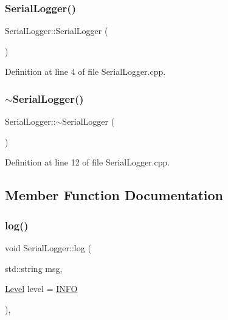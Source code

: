 \subsubsection{\texorpdfstring{Serial\+Logger()}{SerialLogger()}}
{\footnotesize\ttfamily Serial\+Logger\+::\+Serial\+Logger (\begin{DoxyParamCaption}{ }\end{DoxyParamCaption})}



Definition at line 4 of file Serial\+Logger.\+cpp.

\mbox{\label{class_serial_logger_aa9b4379968cdea3a5aa767d7e17d4df8}} 
\subsubsection{\texorpdfstring{$\sim$\+Serial\+Logger()}{~SerialLogger()}}
{\footnotesize\ttfamily Serial\+Logger\+::$\sim$\+Serial\+Logger (\begin{DoxyParamCaption}{ }\end{DoxyParamCaption})\hspace{0.3cm}{\ttfamily [virtual]}}



Definition at line 12 of file Serial\+Logger.\+cpp.



\subsection{Member Function Documentation}
\mbox{\label{class_serial_logger_acb71040c5d7d693cecfd08c1013449dc}} 
\subsubsection{\texorpdfstring{log()}{log()}}
{\footnotesize\ttfamily void Serial\+Logger\+::log (\begin{DoxyParamCaption}\item[{std\+::string}]{msg,  }\item[{\hyperlink{class_i_logger_af129a40b0950160d0fe6c6b675d9d761}{Level}}]{level = {\ttfamily \hyperlink{class_i_logger_af129a40b0950160d0fe6c6b675d9d761a1de9525e76b4d18631d4371fb0e4697c}{I\+N\+FO}} }\end{DoxyParamCaption})\hspace{0.3cm}{\ttfamily [override]}, {\ttfamily [virtual]}}



